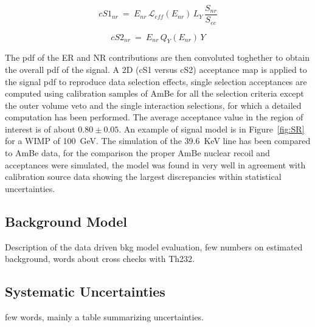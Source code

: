 \begin{equation}
cS1_{nr} ~=~ E_{nr} \, \mathcal{L}_{eff}(E_{nr}) \, L_{Y} \, \frac{S_{nr}}{S_{ee}}
\label{f:cs1}
\end{equation}

\begin{equation}
cS2_{nr}  ~ = ~ E_{nr} \, Q_{Y}(E_{nr}) \, Y
\label{f:cs2}
\end{equation}

The pdf of the ER and NR contributions are then convoluted toghether to obtain the overall pdf of the signal.
A 2D (cS1 versus cS2) acceptance map is applied to the signal pdf to reproduce data selection effects, single selection acceptances
are computed using calibration samples of AmBe for all the selection criteria except the outer volume veto and the single interaction selections, 
for which a detailed computation has been performed. The average acceptance value in the region of interest is of about $0.80 \pm 0.05$. 
An example of signal model is in Figure~\ref{fig:SR} for a WIMP of 100~GeV. 
The simulation of the 39.6~KeV line has been compared to AmBe data, for the comparison the proper AmBe nuclear recoil and acceptances
were simulated, the model was found in very well in agreement with calibration source data showing the largest discrepancies within 
statistical uncertainties.


\subsection {Background Model}
Description of the data driven bkg model evaluation, few numbers on estimated background, words about cross checks with Th232.

\subsection{Systematic Uncertainties}

few words, mainly a table summarizing uncertainties.

